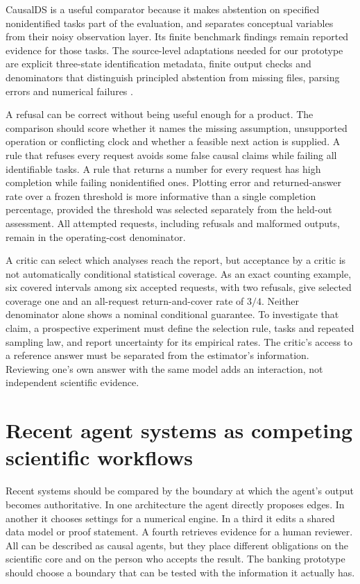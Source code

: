 CausalDS is a useful comparator because it makes abstention on specified
nonidentified tasks part of the evaluation, and separates conceptual variables
from their noisy observation layer. Its finite benchmark findings remain
reported evidence for those tasks. The source-level adaptations needed for our
prototype are explicit three-state identification metadata, finite output
checks and denominators that distinguish principled abstention from missing
files, parsing errors and numerical failures
\citep{v12_la_2607_08093,exec14_estimation_sources}.

A refusal can be correct without being useful enough for a product. The
comparison should score whether it names the missing assumption, unsupported
operation or conflicting clock and whether a feasible next action is supplied.
A rule that refuses every request avoids some false causal claims while failing
all identifiable tasks. A rule that returns a number for every request has high
completion while failing nonidentified ones. Plotting error and returned-answer
rate over a frozen threshold is more informative than a single completion
percentage, provided the threshold was selected separately from the held-out
assessment. All attempted requests, including refusals and malformed outputs,
remain in the operating-cost denominator.

A critic can select which analyses reach the report, but acceptance by a critic
is not automatically conditional statistical coverage. As an exact counting
example, six covered intervals among six accepted requests, with two refusals,
give selected coverage one and an all-request return-and-cover rate of $3/4$.
Neither denominator alone shows a nominal conditional guarantee. To investigate
that claim, a prospective experiment must define the selection rule, tasks and
repeated sampling law, and report uncertainty for its empirical rates. The
critic's access to a reference answer must be separated from the estimator's
information. Reviewing one's own answer with the same model adds an interaction,
not independent scientific evidence.

\section{Recent agent systems as competing scientific workflows}

Recent systems should be compared by the boundary at which the agent's output
becomes authoritative. In one architecture the agent directly proposes edges.
In another it chooses settings for a numerical engine. In a third it edits a
shared data model or proof statement. A fourth retrieves evidence for a human
reviewer. All can be described as causal agents, but they place different
obligations on the scientific core and on the person who accepts the result.
The banking prototype should choose a boundary that can be tested with the
information it actually has.

